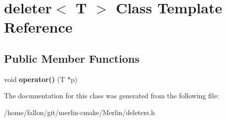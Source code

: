\hypertarget{classdeleter}{}\section{deleter$<$ T $>$ Class Template Reference}
\label{classdeleter}
\subsection*{Public Member Functions}
\begin{DoxyCompactItemize}
\item 
\mbox{\label{classdeleter_a1f11e6dee735861e4391f150986bd8c0}} 
void {\bfseries operator()} (T $\ast$p)
\end{DoxyCompactItemize}


The documentation for this class was generated from the following file\+:\begin{DoxyCompactItemize}
\item 
/home/fallon/git/merlin-\/cmake/\+Merlin/deleters.\+h\end{DoxyCompactItemize}
